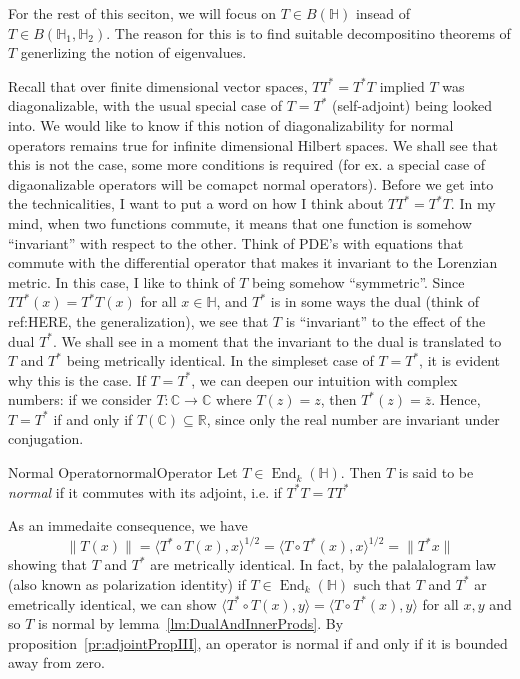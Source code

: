 \documentclass[oneside]{book}
\newcommand{\R}{\mathbb{R}}
\newcommand{\C}{\mathbb{C}}
\renewcommand{\H}{\mathbb{H}}
\newcommand{\sse}{\subseteq}
\newcommand{\oln}{\overline}
\newcommand{\End}{\operatorname{End}}
\begin{document}
For the rest of this seciton, we will focus on $T \in B(\H)$ insead of $T \in B(\H_1, \H_2)$. The reason for this is to
find suitable decompositino theorems of $T$ generlizing the notion of eigenvalues.

Recall that over finite dimensional vector spaces, $TT^* = T^*T$ implied $T$ was diagonalizable, with the usual special case of $T = T^*$
(self-adjoint) being looked into. We would like to know if this notion of diagonalizability for normal operators remains
true for infinite dimensional Hilbert spaces. We shall see that this is not the case, some more conditions is required
(for ex. a special case of digaonalizable operators will be comapct normal operators). Before we get into the
technicalities, I want to put a word on how I think about $TT^* = T^*T$. In my mind, when two functions commute, it
means that one function is somehow ``invariant'' with respect to the other. Think of PDE's with equations that commute
with the differential operator that makes it invariant to the Lorenzian metric. In this case, I like to think of $T$
being somehow ``symmetric''. Since $TT^*(x) = T^*T(x)$ for all $x \in \H$, and $T^*$ is in some ways the dual (think of
ref:HERE, the generalization), we see that $T$ is ``invariant'' to the effect of the dual $T^*$. We shall see in
a moment that the invariant to the dual is translated to $T$ and $T^*$ being metrically identical. In the simpleset case
of $T = T^*$, it is evident why this is the case. If $T = T^*$, we can deepen our intuition with complex numbers: if we
consider $T: \C \to \C$ where $T(z) = z$, then $T^*(z) = \oln{z}$. Hence, $T = T^*$ if and only if $T(\C) \sse \R$,
since only the real number are invariant under conjugation.

\begin{defn}{Normal Operator}{normalOperator}
	Let $T \in \End_k(\H)$. Then $T$ is said to be \emph{normal} if it commutes with its adjoint, i.e. if $T^*T
	=TT^*$
\end{defn}

As an immedaite consequence, we have
\[
	\|T(x)\| = \langle T^*\circ T(x), x \rangle^{1/2} = \langle T\circ T^*(x), x \rangle^{1/2} = \|T^*x\|
\]
showing that $T$ and $T^*$ are metrically identical. In fact, by the palalalogram law (also known as polarization
identity) if $T \in \End_k(\H)$ such that $T$ and $T^*$ ar emetrically identical, we can show $ \langle T^*\circ T(x),
y \rangle = \langle T\circ T^*(x), y\rangle$ for all $x,y$ and so $T$ is normal by lemma~\ref{lm:DualAndInnerProds}. By
proposition~\ref{pr:adjointPropIII}, an operator is normal if and only if it is bounded away from zero.
\end{document}
